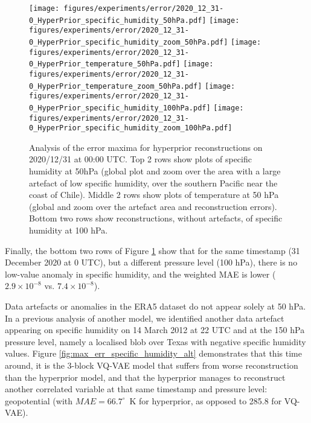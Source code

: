 \begin{figure}
    \centering
    \texttt{[image: figures/experiments/error/2020\_12\_31-0\_HyperPrior\_specific\_humidity\_50hPa.pdf]}
    \texttt{[image: figures/experiments/error/2020\_12\_31-0\_HyperPrior\_specific\_humidity\_zoom\_50hPa.pdf]}
    \texttt{[image: figures/experiments/error/2020\_12\_31-0\_HyperPrior\_temperature\_50hPa.pdf]}
    \texttt{[image: figures/experiments/error/2020\_12\_31-0\_HyperPrior\_temperature\_zoom\_50hPa.pdf]}
    \texttt{[image: figures/experiments/error/2020\_12\_31-0\_HyperPrior\_specific\_humidity\_100hPa.pdf]}
    \texttt{[image: figures/experiments/error/2020\_12\_31-0\_HyperPrior\_specific\_humidity\_zoom\_100hPa.pdf]}
    \hspace*{-2em}
    \caption{Analysis of the error maxima for hyperprior reconstructions on 2020/12/31 at 00:00 UTC. Top 2 rows show plots of specific humidity at 50hPa (global plot and zoom over the area with a large artefact of low specific humidity, over the southern Pacific near the coast of Chile). Middle 2 rows show plots of temperature at 50 hPa (global and zoom over the artefact area and reconstruction errors). Bottom two rows show reconstructions, without artefacts, of specific humidity at 100 hPa.}
    \label{fig:max_err_specific_humidity_hyperprior}
\end{figure}

Finally, the bottom two rows of Figure \ref{fig:max_err_specific_humidity_hyperprior} show that for the same timestamp (31 December 2020 at 0 UTC), but a different pressure level (100 hPa), there is no low-value anomaly in specific humidity, and the weighted MAE is lower ($2.9 \times 10^{-8}$ vs. $7.4 \times 10^{-8}$).

Data artefacts or anomalies in the ERA5 dataset do not appear solely at 50 hPa. In a previous analysis of another model, we identified another data artefact appearing on specific humidity on 14 March 2012 at 22 UTC and at the 150 hPa pressure level, namely a localised blob over Texas with negative specific humidity values. Figure \ref{fig:max_err_specific_humidity_alt} demonstrates that this time around, it is the 3-block VQ-VAE model that suffers from worse reconstruction than the hyperprior model, and that the hyperprior manages to reconstruct another correlated variable at that same timestamp and pressure level: geopotential (with $MAE = 66.7^\circ$~K for hyperprior, as opposed to 285.8 for VQ-VAE).

